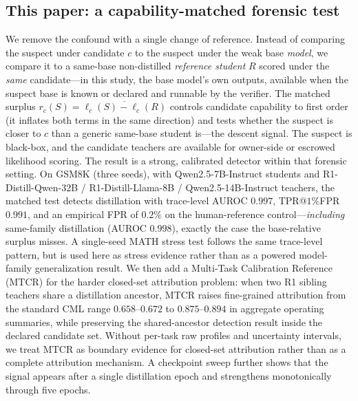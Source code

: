 \documentclass[journal]{IEEEtran}
\begin{document}
\subsection{This paper: a capability-matched forensic test}
We remove the confound with a single change of reference. Instead of comparing the
suspect under candidate $c$ to the suspect under the weak base \emph{model}, we
compare it to a same-base non-distilled \emph{reference student} $R$ scored under the
\emph{same} candidate---in this study, the base model's own outputs, available when
the suspect base is known or declared and runnable by the verifier. The matched
surplus $r_c(S)=\overline{\ell_c(S)-\ell_c(R)}$ controls candidate capability to
first order (it inflates both terms in the same direction) and tests whether the
suspect is closer to $c$ than a generic same-base student is---the descent signal.
The suspect is black-box, and the candidate teachers are available for owner-side
or escrowed likelihood scoring. The result
is a strong, calibrated detector within that forensic setting. On GSM8K (three
seeds), with Qwen2.5-7B-Instruct students and R1-Distill-Qwen-32B /
R1-Distill-Llama-8B / Qwen2.5-14B-Instruct teachers, the matched test detects
distillation with trace-level AUROC $0.997$, TPR@$1\%$FPR $0.991$, and an empirical
FPR of $0.2\%$ on the human-reference control---\emph{including} same-family
distillation (AUROC $0.998$), exactly the case the base-relative surplus misses. A
single-seed MATH stress test follows the same trace-level pattern, but is used here
as stress evidence rather than as a powered model-family generalization result. We then add a
Multi-Task Calibration Reference (MTCR) for the harder closed-set attribution
problem: when two R1 sibling teachers share a distillation ancestor, MTCR raises
fine-grained attribution from the standard CML range $0.658$--$0.672$ to
$0.875$--$0.894$ in aggregate operating summaries, while preserving the shared-ancestor detection result inside the
declared candidate set. Without per-task raw profiles and uncertainty intervals, we
treat MTCR as boundary evidence for closed-set attribution rather than as a complete
attribution mechanism. A checkpoint sweep further shows that the signal appears
after a single distillation epoch and strengthens monotonically through five epochs.
\end{document}
